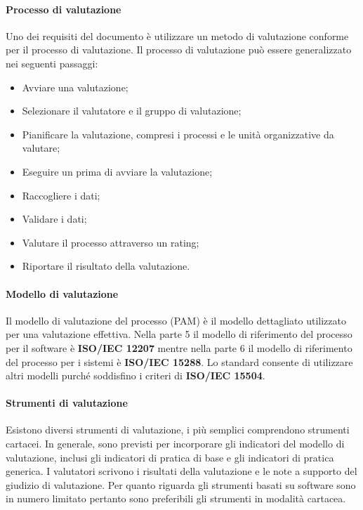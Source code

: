\documentclass[../norme-di-progetto.tex]{subfiles}
\begin{document}
\paragraph{Processo di valutazione}
\label{sub:processo_di_valutazione}
Uno dei requisiti del documento è utilizzare un metodo di valutazione conforme per il processo di valutazione.
Il processo di valutazione può essere generalizzato nei seguenti passaggi:
\begin{itemize}
    \item Avviare una valutazione;
    \item Selezionare il valutatore e il gruppo di valutazione;
    \item Pianificare la valutazione, compresi i processi e le unità organizzative da valutare;
    \item Eseguire un  prima di avviare la valutazione;
    \item Raccogliere i dati;
    \item Validare i dati;
    \item Valutare il processo attraverso un rating;
    \item Riportare il risultato della valutazione.
\end{itemize}

\paragraph{Modello di valutazione}
\label{sub:modello_di_valutazione}
Il modello di valutazione del processo (PAM) è il modello dettagliato utilizzato per una valutazione effettiva.
Nella parte 5 il modello di riferimento del processo per il software è \textbf{ISO/IEC 12207} mentre nella parte 6 il modello di riferimento del processo per i sistemi è \textbf{ISO/IEC 15288}.
Lo standard consente di utilizzare altri modelli purché soddisfino i criteri di \textbf{ISO/IEC 15504}.

\paragraph{Strumenti di valutazione}
\label{sub:strumenti_di_valutazione}
Esistono diversi strumenti di valutazione, i più semplici comprendono strumenti cartacei. In generale, sono previsti per incorporare gli indicatori del modello di valutazione, inclusi gli indicatori di pratica di base e gli indicatori di pratica generica. I valutatori scrivono i risultati della valutazione e le note a supporto del giudizio di valutazione.
Per quanto riguarda gli strumenti basati su software sono in numero limitato pertanto sono preferibili gli strumenti in modalità cartacea.
\end{document}
